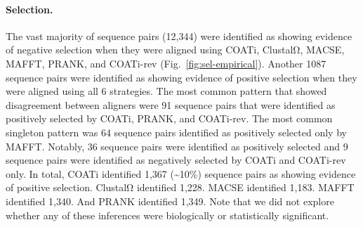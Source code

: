 \documentclass[12pt,letterpaper]{article}
\begin{document}
\paragraph{Selection.}

The vast majority of sequence pairs (12,344) were identified as showing evidence of negative selection when they were aligned using COATi, ClustalΩ, MACSE, MAFFT, PRANK, and COATi-rev (Fig.~\ref{fig:sel-empirical}). Another 1087 sequence pairs were identified as showing evidence of positive selection when they were aligned using all 6 strategies. The most common pattern that showed disagreement between aligners were 91 sequence pairs that were identified as positively selected by COATi, PRANK, and COATi-rev. The most common singleton pattern was 64 sequence pairs identified as positively selected only by MAFFT. Notably, 36 sequence pairs were identified as positively selected and 9 sequence pairs were identified as negatively selected by COATi and COATi-rev only.
%
In total, COATi identified 1,367 (\sim{}10\%) sequence pairs as showing evidence of positive selection. ClustalΩ identified 1,228. MACSE identified 1,183. MAFFT identified 1,340. And PRANK identified 1,349. Note that we did not explore whether any of these inferences were biologically or statistically significant.
\end{document}
